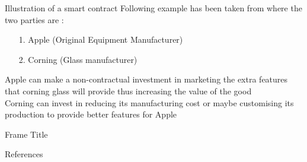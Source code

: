 \documentclass{beamer}
\begin{document}
\begin{frame}{Illustration of a smart contract }
Following example has been taken from \cite{holden2017can} where the two parties are :
\begin{itemize}
    \item[1.] Apple (Original Equipment Manufacturer)
    \item [2.] Corning (Glass manufacturer)
\end{itemize}
Apple can make a non-contractual investment in marketing the extra features that corning glass will provide thus increasing the value of the good \\
Corning can invest in reducing its manufacturing cost or maybe customising its production to provide better features for Apple
\end{frame}
\begin{frame}{Frame Title}
    
\end{frame}
\begin{frame}{References}
 
   
\end{frame}
\end{document}
